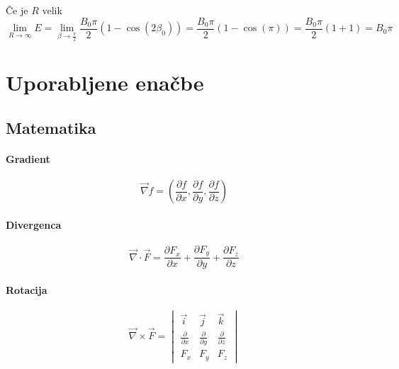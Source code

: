 \documentclass[a4paper,12pt]{article}
\begin{document}
\subsection{}
Če je $R$ velik
\begin{equation}
    \lim_{R \to \infty} E = \lim_{\beta \to \frac{\pi}{2}} \frac{B_0 \pi}{2} (1 - \cos(2\beta_0)) = \frac{B_0 \pi}{2} (1 - \cos(\pi)) = \frac{B_0 \pi}{2} (1 + 1) = B_0 \pi
\end{equation}




\newpage
\section{Uporabljene enačbe}
\subsection{Matematika}
\begin{multicols}{2}

    \paragraph{Gradient}
    \begin{equation}
        \label{eq:gradient}
        \vec{\nabla} f = \left( \frac{\partial f}{\partial x}, \frac{\partial f}{\partial y}, \frac{\partial f}{\partial z} \right)
    \end{equation}

    \paragraph{Divergenca}
    \begin{equation}
        \label{eq:divergenca}
        \vec{\nabla} \cdot \vec{F} = \frac{\partial F_x}{\partial x} + \frac{\partial F_y}{\partial y} + \frac{\partial F_z}{\partial z}
    \end{equation}

    \paragraph{Rotacija}
    \begin{equation}
        \label{eq:rotacija}
        \vec{\nabla} \times \vec{F} = \begin{vmatrix}
            \vec{i}                     & \vec{j}                     & \vec{k}                     \\
            \frac{\partial}{\partial x} & \frac{\partial}{\partial y} & \frac{\partial}{\partial z} \\
            F_x                         & F_y                         & F_z
        \end{vmatrix}
    \end{equation}

\end{multicols}
\end{document}

